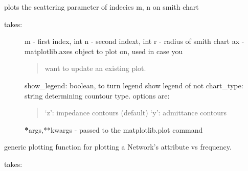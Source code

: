 \documentclass[letterpaper,10pt,english]{sphinxmanual}
\begin{document}
\begin{fulllineitems}
\begin{fulllineitems}
\begin{description}
\end{description}

\end{fulllineitems}


\begin{fulllineitems}
\label{api/mwavepy:mwavepy.network.Network.plot_s_smith}
plots the scattering parameter of indecies m, n on smith chart
\begin{description}
\item[{takes:}] \leavevmode
m - first index, int
n - second indext, int
r -  radius of smith chart
ax - matplotlib.axes object to plot on, used in case you
\begin{quote}

want to update an existing plot.
\end{quote}

show\_legend: boolean, to turn legend show legend of not
chart\_type: string determining countour type. options are:
\begin{quote}

`z': impedance contours (default)
`y': admittance contours
\end{quote}

{\color{red}\bfseries{}*}args,**kwargs - passed to the matplotlib.plot command

\end{description}

\end{fulllineitems}


\begin{fulllineitems}
\label{api/mwavepy:mwavepy.network.Network.plot_vs_frequency_generic}
generic plotting function for plotting a Network's attribute
vs frequency.

takes:

\end{fulllineitems}



\end{fulllineitems}
\end{document}
